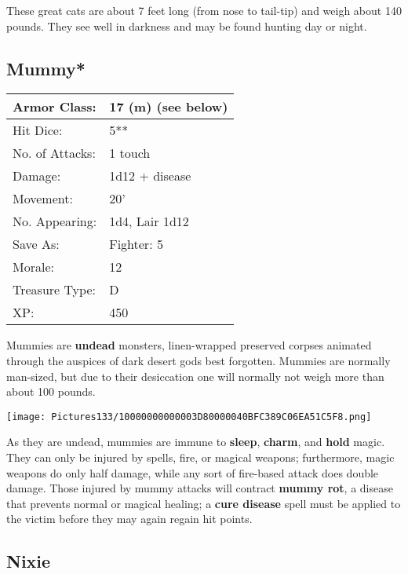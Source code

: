 \documentclass[a4paper,twoside,openany,10pt]{book}
\begin{document}
\begin{multicols}{2}
These great cats are about 7 feet long (from nose to tail-tip) and weigh about 140 pounds. They see well in darkness and may be found hunting day
or night.

\subsection*{Mummy*}\label{mummy}

\begin{tabularx}{0.50\textwidth}{@{}lX@{}} 
Armor Class: & 17 (m) (see below) \\\hline
Hit Dice: & 5** \\\hline
No. of Attacks: & 1 touch \\\hline
Damage: & 1d12 + disease \\\hline
Movement: & 20' \\\hline
No. Appearing: & 1d4, Lair 1d12 \\\hline
Save As: & Fighter: 5 \\\hline
Morale: & 12 \\\hline
Treasure Type: & D \\\hline
XP: & 450 \\\hline
\end{tabularx}\medskip

Mummies are \textbf{undead} monsters, linen-wrapped preserved corpses animated through the auspices of dark desert gods best forgotten. Mummies are normally man-sized, but due to their desiccation one will normally not weigh more than about 100 pounds.


\begin{center} \texttt{[image: Pictures133/10000000000003D80000040BFC389C06EA51C5F8.png]} \end{center}

As they are undead, mummies are immune to \textbf{sleep}, \textbf{charm}, and \textbf{hold} magic. They can only be injured by spells, fire, or magical weapons; furthermore, magic weapons do only half damage, while any sort of fire-based attack does double damage. Those injured by mummy attacks will contract \textbf{mummy rot}, a disease that prevents normal or magical healing; a \textbf{cure disease }spell must be applied to the victim before they may again regain hit points.

\subsection*{Nixie}\label{nixie}


\end{multicols}
\end{document}

